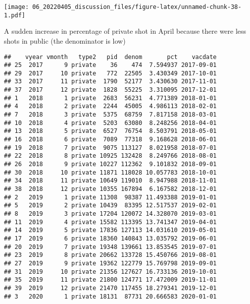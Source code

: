 \documentclass[
]{article}
\newenvironment{Shaded}{\begin{snugshade}}{\end{snugshade}}
\newcommand{\FunctionTok}[1]{\textcolor[rgb]{0.00,0.00,0.00}{#1}}
\newcommand{\NormalTok}[1]{#1}
\newcommand{\OtherTok}[1]{\textcolor[rgb]{0.56,0.35,0.01}{#1}}
\newcommand{\SpecialCharTok}[1]{\textcolor[rgb]{0.00,0.00,0.00}{#1}}
\begin{document}
\texttt{[image: 06\_20220405\_discussion\_files/figure-latex/unnamed-chunk-38-1.pdf]}

A sudden increase in percentage of private shot in April because there
were less shots in public (the denominator is low)

\begin{Shaded}
\end{Shaded}

\begin{verbatim}
##    vyear vmonth   type2   pid  denom       pct    vacdate
## 25  2017      9 private    36    474  7.594937 2017-09-01
## 29  2017     10 private   772  22505  3.430349 2017-10-01
## 33  2017     11 private  1790  52177  3.430630 2017-11-01
## 37  2017     12 private  1828  55225  3.310095 2017-12-01
## 1   2018      1 private  2683  56231  4.771389 2018-01-01
## 4   2018      2 private  2244  45005  4.986113 2018-02-01
## 7   2018      3 private  5375  68759  7.817158 2018-03-01
## 10  2018      4 private  5203  63080  8.248256 2018-04-01
## 13  2018      5 private  6527  76754  8.503791 2018-05-01
## 16  2018      6 private  7089  77318  9.168628 2018-06-01
## 19  2018      7 private  9075 113127  8.021958 2018-07-01
## 22  2018      8 private 10925 132428  8.249766 2018-08-01
## 26  2018      9 private 10227 112362  9.101832 2018-09-01
## 30  2018     10 private 11871 118028 10.057783 2018-10-01
## 34  2018     11 private 10649 119010  8.947988 2018-11-01
## 38  2018     12 private 10355 167894  6.167582 2018-12-01
## 2   2019      1 private 11308  98387 11.493388 2019-01-01
## 5   2019      2 private 10439  83395 12.517537 2019-02-01
## 8   2019      3 private 17204 120072 14.328070 2019-03-01
## 11  2019      4 private 15582 113395 13.741347 2019-04-01
## 14  2019      5 private 17836 127113 14.031610 2019-05-01
## 17  2019      6 private 18360 140843 13.035792 2019-06-01
## 20  2019      7 private 19348 139661 13.853545 2019-07-01
## 23  2019      8 private 20662 133728 15.450766 2019-08-01
## 27  2019      9 private 19362 122779 15.769798 2019-09-01
## 31  2019     10 private 21356 127627 16.733136 2019-10-01
## 35  2019     11 private 21800 124771 17.472009 2019-11-01
## 39  2019     12 private 21470 117455 18.279341 2019-12-01
## 3   2020      1 private 18131  87731 20.666583 2020-01-01

\end{verbatim}
\end{document}
